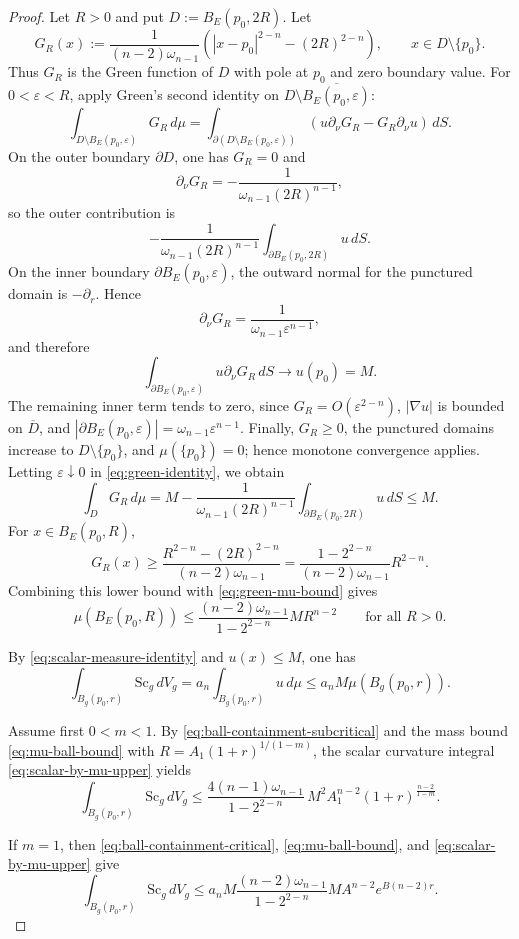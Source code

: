 \documentclass[12pt,oneside,a4paper]{article}
\theoremstyle{mytheorem}
\theoremstyle{remark}
\begin{document}
\begin{proof}
Let $R>0$ and put $D:=B_E(p_0,2R)$.  Let
\[
G_R(x):=\frac{1}{(n-2)\omega_{n-1}}
\left(|x-p_0|^{2-n}-(2R)^{2-n}\right),
\qquad x\in D\setminus\{p_0\}.
\]
Thus $G_R$ is the Green function of $D$ with pole at $p_0$ and zero boundary
value.  For $0<\varepsilon<R$, apply Green's second identity on
$D\setminus\overline{B_E(p_0,\varepsilon)}$:
\begin{equation}\label{eq:green-identity}
\int_{D\setminus B_E(p_0,\varepsilon)}G_R\,d\mu
=
\int_{\partial(D\setminus B_E(p_0,\varepsilon))}
\left(u\partial_\nu G_R-G_R\partial_\nu u\right)\,d S.
\end{equation}
On the outer boundary $\partial D$, one has $G_R=0$ and
\[
\partial_\nu G_R=-\frac{1}{\omega_{n-1}(2R)^{n-1}},
\]
so the outer contribution is
\[
-\frac{1}{\omega_{n-1}(2R)^{n-1}}
\int_{\partial B_E(p_0,2R)}u\,d S.
\]
On the inner boundary $\partial B_E(p_0,\varepsilon)$, the outward normal for
the punctured domain is $-\partial_r$.  Hence
\[
\partial_\nu G_R=\frac{1}{\omega_{n-1}\varepsilon^{n-1}},
\]
and therefore
\[
\int_{\partial B_E(p_0,\varepsilon)}u\partial_\nu G_R\,d S\longrightarrow u(p_0)=M.
\]
The remaining inner term tends to zero, since $G_R=O(\varepsilon^{2-n})$,
$|\nabla u|$ is bounded on $\overline{D}$, and
$|\partial B_E(p_0,\varepsilon)|=\omega_{n-1}\varepsilon^{n-1}$.
Finally, $G_R\ge0$, the punctured domains increase to $D\setminus\{p_0\}$, and
$\mu(\{p_0\})=0$; hence monotone convergence applies.  Letting
$\varepsilon\downarrow0$ in \eqref{eq:green-identity}, we obtain
\begin{equation}\label{eq:green-mu-bound}
\int_DG_R\,d\mu
=
M-\frac{1}{\omega_{n-1}(2R)^{n-1}}
\int_{\partial B_E(p_0,2R)}u\,d S
\le M.
\end{equation}
For $x\in B_E(p_0,R)$,
\[
G_R(x)\ge
\frac{R^{2-n}-(2R)^{2-n}}{(n-2)\omega_{n-1}}
=
\frac{1-2^{2-n}}{(n-2)\omega_{n-1}}R^{2-n}.
\]
Combining this lower bound with \eqref{eq:green-mu-bound} gives
\begin{equation}\label{eq:mu-ball-bound}
\mu(B_E(p_0,R))
\le
\frac{(n-2)\omega_{n-1}}{1-2^{2-n}}MR^{n-2}
\qquad\text{for all }R>0.
\end{equation}


By \eqref{eq:scalar-measure-identity} and $u(x)\le M$, one has
\begin{equation}\label{eq:scalar-by-mu-upper}
\int_{B_g(p_0,r)}\mathrm{Sc}_g\,dV_g
=a_n\int_{B_g(p_0,r)}u\,d\mu
\le a_nM\mu(B_g(p_0,r)).
\end{equation}

Assume first $0 < m < 1$. By \eqref{eq:ball-containment-subcritical} and the mass bound \eqref{eq:mu-ball-bound} with $R=A_1(1+r)^{1/(1-m)}$, the scalar curvature integral \eqref{eq:scalar-by-mu-upper} yields
\[
\int_{B_g(p_0,r)}\mathrm{Sc}_g\,dV_g
\le
\frac{4(n-1)\omega_{n-1}}{1-2^{2-n}}\,
M^2A_1^{n-2}(1+r)^{\frac{n-2}{1-m}}.
\]


If $m=1$, then \eqref{eq:ball-containment-critical}, \eqref{eq:mu-ball-bound},
and \eqref{eq:scalar-by-mu-upper} give
\[
\int_{B_g(p_0,r)}\mathrm{Sc}_g\,dV_g
\le
 a_nM\frac{(n-2)\omega_{n-1}}{1-2^{2-n}}
 M A^{n-2}e^{B(n-2)r}.
\]
\end{proof}
\end{document}
